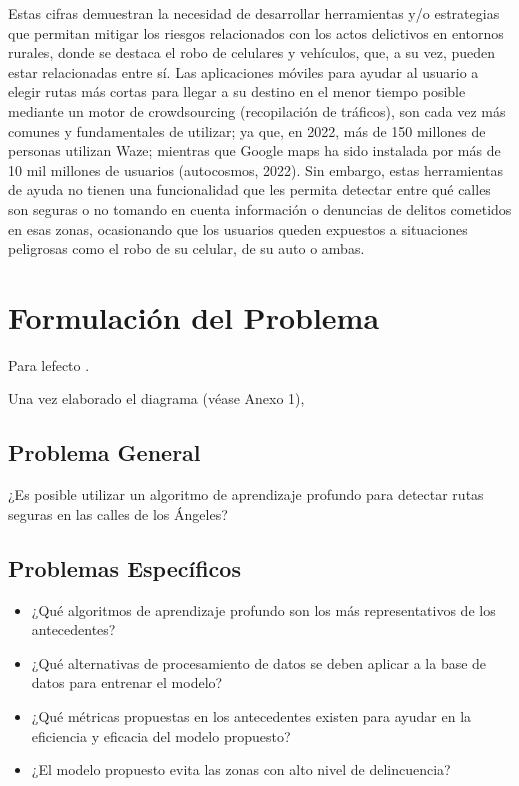 Estas cifras demuestran la necesidad de desarrollar herramientas y/o estrategias que permitan mitigar los riesgos relacionados con los actos delictivos en entornos rurales, donde se destaca el robo de celulares y vehículos, que, a su vez, pueden estar relacionadas entre sí. Las aplicaciones móviles para ayudar al usuario a elegir rutas más cortas para llegar a su destino en el menor tiempo posible mediante un motor de crowdsourcing (recopilación de tráficos), son cada vez más comunes y fundamentales de utilizar; ya que, en 2022, más de 150 millones de personas utilizan Waze; mientras que Google maps ha sido instalada por más de 10 mil millones de usuarios (autocosmos, 2022). Sin embargo, estas herramientas de ayuda no tienen una funcionalidad que les permita detectar entre qué calles son seguras o no tomando en cuenta información o denuncias de delitos cometidos en esas zonas, ocasionando que los usuarios queden expuestos a situaciones peligrosas como el robo de su celular, de su auto o ambas. 



\section{Formulación del Problema}

Para lefecto \parencite{ot_marti2018manual}. 


Una vez elaborado el diagrama (véase Anexo 1), 

\subsection{Problema General}
\newcommand{\ProblemaGeneral}{
	¿Es posible utilizar un algoritmo de aprendizaje profundo para detectar rutas seguras en las calles de los Ángeles? 
}
\ProblemaGeneral
\subsection{Problemas Espec\'{i}ficos}
\newcommand{\Pbone}{
¿Qué algoritmos de aprendizaje profundo son los más representativos de los antecedentes?
}
\newcommand{\Pbtwo}{
¿Qué alternativas de procesamiento de datos se deben aplicar a la base de datos para entrenar el modelo?
}
\newcommand{\Pbthree}{
¿Qué métricas propuestas en los antecedentes existen para ayudar en la eficiencia y eficacia del modelo propuesto?
}
\newcommand{\Pbfour}{
¿El modelo propuesto evita las zonas con alto nivel de delincuencia?
}

\begin{itemize}
	\item \Pbone
	\item \Pbtwo
	\item \Pbthree
	\item \Pbfour
\end{itemize}

